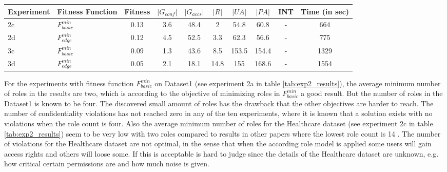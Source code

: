 \begin{table}
    \bigskip
    \begin{adjustbox}{width=\textwidth}
    	\begin{tabular}{|l|l|c|c|c|c|c|c|c|c|}
        	\hline
        	\rowcolor{myGray} 
        	\textbf{Experiment} & \textbf{Fitness Function} & \textbf{Fitness} & \textbf{$|G_{conf}|$} & \textbf{$|G_{accs}|$} & \textbf{$|R|$} & \textbf{$|UA|$} & \textbf{$|PA|$} & \textbf{INT} & \textbf{Time (in sec)}\\ \hline
        	2c & $F_{basic}^{min}$ &   0.13   &   3.6   &   48.4   &   2   &   54.8   &   60.8   &   -   & 664\\ \hline
        	2d & $F_{edge}^{min}$ &   0.12   &   4.5   &   52.5   &   3.3   &   62.3   &   56.6   &   -   & 775\\ \hline
        	3c & $F_{basic}^{min}$ &   0.09   &   1.3   &   43.6   &   8.5   &   153.5   &   154.4   &   -   & 1329\\ \hline
        	3d & $F_{edge}^{min}$  &   0.05   &   2.1   &   18.1   &   14.8   &   155   &   168.6   &   -   & 1554\\ \hline
        \end{tabular}
	\end{adjustbox}
\end{table}

For the experiments with fitness function $F_{basic}^{min}$ on Dataset1 (see experiment 2a in table \ref{tab:exp2_results}), the average minimum number of roles in the results are two, which is according to the objective of minimizing roles in $F_{basic}^{min}$ a good result. But the number of roles in the Dataset1 is known to be four. The discovered small amount of roles has the drawback that the other objectives are harder to reach. The number of confidentiality violations has not reached zero in any of the ten experiments, where it is known that a solution exists with no violations when the role count is four. Also the average minimum number of roles for the Healthcare dataset (see experiment 2c in table \ref{tab:exp2_results}) seem to be very low with two roles compared to results in other papers where the lowest role count is 14 \cite{Ene}\cite{Molloy:2009:ERM:1542207.1542224}. The number of violations for the Healthcare dataset are not optimal, in the sense that when the according role model is applied some users will gain access rights and others will loose some. If this is acceptable is hard to judge since the details of the Healthcare dataset are unknown, e.g. how critical certain permissions are and how much noise is given.

